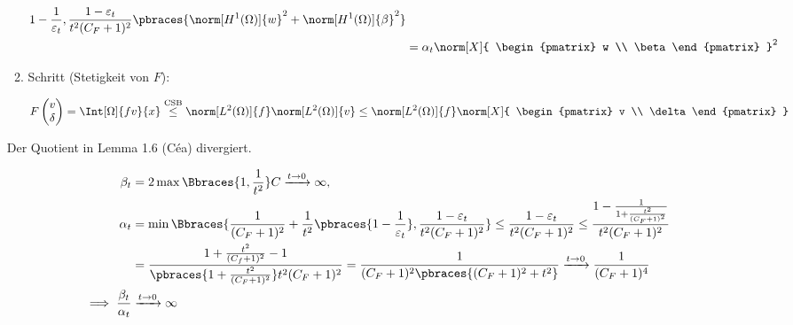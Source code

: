 \begin{solution}
\begin{enumerate}[label = \textbf{\alph*)}]
\begin{enumerate}[label = \arabic*.]
\begin{align*}
{{          1 - \frac{1}{\varepsilon_t}
        },
        \frac
        {
          1 - \varepsilon_t
        }{
          t^2 (C_F + 1)^2
        }
      }
      \pbraces
      {
        \norm[H^1(\Omega)]{w}^2
        +
        \norm[H^1(\Omega)]{\beta}^2
      } \\
      & =
      \alpha_t
      \norm[X]
      {
        \begin{pmatrix}
          w \\ \beta
        \end{pmatrix}
      }^2
    \end{align*}

    \item Schritt (Stetigkeit von $F$):

    \begin{align*}
      F
      \begin{pmatrix}
        v \\ \delta
      \end{pmatrix}
      =
      \Int[\Omega]{f v}{x}
      \stackrel
      {
        \mathrm{CSB}
      }{\leq}
      \norm[L^2(\Omega)]{f}
      \norm[L^2(\Omega)]{v}
      \leq
      \norm[L^2(\Omega)]{f}
      \norm[X]
      {
        \begin{pmatrix}
          v \\ \delta
        \end{pmatrix}
      }
    \end{align*}

  \end{enumerate}


  Der Quotient in Lemma 1.6 (Céa) divergiert.

  \begin{align*}
    \beta_t
    & =
    2 \max \Bbraces{1, \frac{1}{t^2}} C
    \xrightarrow{t \to 0}
    \infty, \\
    \alpha_t
    & =
    \min
    \Bbraces
    {
      \frac{1}{(C_F + 1)^2}
      +
      \frac{1}{t^2}
      \pbraces
      {
        1 - \frac{1}{\varepsilon_t}
      },
      \frac
      {
        1 - \varepsilon_t
      }{
        t^2 (C_F + 1)^2
      }
    }
    \leq
    \frac
    {
      1 - \varepsilon_t
    }{
      t^2 (C_F + 1)^2
    }
    \leq
    \frac
    {
      1
      -
      \frac{1}
      {
        1
        +
        \frac{t^2}{(C_F + 1)^2}
      }
    }{
      t^2 (C_F + 1)^2
    } \\
    & =
    \frac
    {
      1 + \frac{t^2}{(C_f + 1)^2} - 1
    }{
      \pbraces
      {
        1 + \frac{t^2}{(C_F + 1)^2}
      }
      t^2 (C_F + 1)^2
    }
    =
    \frac{1}
    {
      (C_F + 1)^2
      \pbraces
      {
        (C_F + 1)^2 + t^2
      }
    }
    \xrightarrow{t \to 0}
    \frac{1}{(C_F + 1)^4} \\
    \implies
    \frac{\beta_t}{\alpha_t}
    & \xrightarrow{t \to 0}
    \infty
  \end{align*}


\end{enumerate}
\end{solution}
